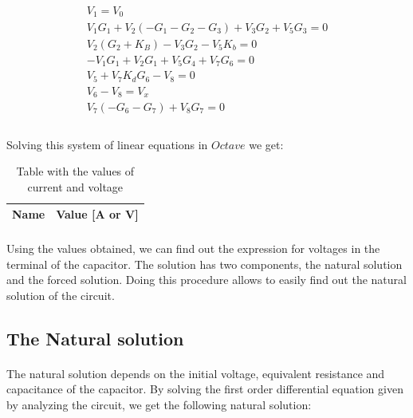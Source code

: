 \begin{center}
  \begin{gather*}
    V_1=V_0 \\
    V_1G_1+V_2(-G_1-G_2-G_3)+V_3G_2+V_5G_3=0 \\
    V_2(G_2+K_B)-V_3G_2-V_5K_b=0 \\
    -V_1G_1+V_2G_1+V_5G_4+V_7G_6=0 \\
    V_5+V_7K_dG_6-V_8=0 \\
    V_6-V_8=V_x \\
    V_7(-G_6-G_7)+V_8G_7=0 \\
  \end{gather*}
\end{center}


\paragraph{} Solving this system of linear equations in $Octave$ we get:

\begin{table}[h]
  \centering
  \begin{tabular}{|l|r|}
    \hline
    {\bf Name} & {\bf Value [A or V]} \\ \hline
    
  \end{tabular}
  \caption{Table with the values of current and voltage}
  \label{tab:op2}
\end{table}


\paragraph{} Using the values obtained, we can find out the expression for
voltages in the terminal of the capacitor. The solution has two components,
the natural solution and the forced solution. Doing this procedure allows to easily find out
the natural solution of the circuit.


\subsection{The Natural solution} \label{2.3}

\paragraph{} The natural solution depends on the initial voltage, equivalent resistance and
capacitance of the capacitor. By solving the first order differential equation given by analyzing the circuit,
we get the following natural solution:

